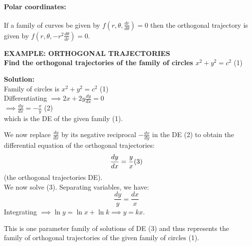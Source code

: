 \documentclass[11pt,a4paper]{article}
\begin{document}
\paragraph{Polar coordinates:}
If a family of curves be given by $f\left(r, \theta, \frac{dr}{d\theta}\right) = 0$ then the orthogonal trajectory is given by $f\left(r, \theta, -r^2 \frac{d\theta}{dr}\right) = 0$.

\begin{tcolorbox}[colback=LightBg, colframe=BorderGray, arc=4mm]
    {\small\textbf{\textcolor{AccentBlue}{EXAMPLE: ORTHOGONAL TRAJECTORIES}}}
    \vspace{0.2cm}\\
    \textbf{Find the orthogonal trajectories of the family of circles $x^2 + y^2 = c^2$} \hfill (1)
    
    \vspace{0.2cm}
    \textbf{Solution:} \\
    Family of circles is $x^2 + y^2 = c^2$ \hfill (1) \\
    Differentiating $\implies 2x + 2y \frac{dy}{dx} = 0$ \\
    $\implies \displaystyle \frac{dy}{dx} = - \frac{x}{y}$ \hfill (2) \\
    which is the DE of the given family (1).
    
    We now replace $\frac{dy}{dx}$ by its negative reciprocal $-\frac{dx}{dy}$ in the DE (2) to obtain the differential equation of the orthogonal trajectories:
    \[ \frac{dy}{dx} = \frac{y}{x} \hfill (3) \]
    (the orthogonal trajectories DE). \\
    We now solve (3). Separating variables, we have:
    \[ \frac{dy}{y} = \frac{dx}{x} \]
    Integrating $\implies \ln y = \ln x + \ln k \implies y = kx$.
    
    This is one parameter family of solutions of DE (3) and thus represents the family of orthogonal trajectories of the given family of circles (1).
    
    \begin{center}
    \end{center}
\end{tcolorbox}
\end{document}
